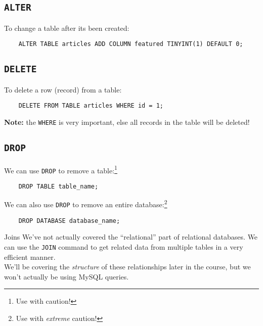 \subsection{\texttt{ALTER}}

To change a table after its been created:

\begin{verbatim}
    ALTER TABLE articles ADD COLUMN featured TINYINT(1) DEFAULT 0;
\end{verbatim}

\subsection{\texttt{DELETE}}

To delete a row (record) from a table:

\begin{verbatim}
    DELETE FROM TABLE articles WHERE id = 1;
\end{verbatim}

\textbf{Note:} the \texttt{WHERE} is very important, else all records in the table will be deleted!

\subsection{\texttt{DROP}}

We can use \texttt{DROP} to remove a table:\footnote{Use with caution!}

\begin{verbatim}
    DROP TABLE table_name;
\end{verbatim}

We can also use \texttt{DROP} to remove an entire database:\footnote{Use with \textit{extreme} caution!}

\begin{verbatim}
    DROP DATABASE database_name;
\end{verbatim}

\begin{infobox}{Joins}
    We've not actually covered the ``relational'' part of relational databases. We can use the \texttt{JOIN} command to get related data from multiple tables in a very efficient manner.
    \\

    We'll be covering the \textit{structure} of these relationships later in the course, but we won't actually be using MySQL queries.
\end{infobox}


